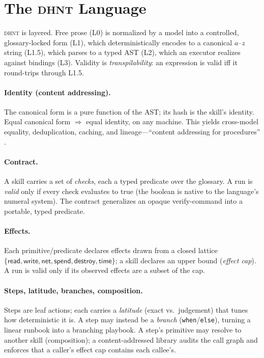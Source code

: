 \documentclass[11pt]{article}
\newcommand{\dhnt}{\textsc{dhnt}}
\begin{document}
\section{The \dhnt{} Language}\label{sec:lang}

\dhnt{} is layered. Free prose (L0) is normalized by a model into a controlled,
glossary-locked form (L1), which deterministically encodes to a canonical
$a$--$z$ string (L1.5), which parses to a typed AST (L2), which an executor
realizes against bindings (L3). Validity is \emph{transpilability}: an expression
is valid iff it round-trips through L1.5.

\paragraph{Identity (content addressing).} The canonical form is a pure function
of the AST; its hash is the skill's identity. Equal canonical form $\Rightarrow$
equal identity, on any machine. This yields cross-model equality, deduplication,
caching, and lineage---``content addressing for procedures'' \cite{merkle}.

\paragraph{Contract.} A skill carries a set of \emph{checks}, each a typed
predicate over the glossary. A run is \emph{valid} only if every check evaluates
to true (the boolean is native to the language's numeral system). The contract
generalizes an opaque verify-command into a portable, typed predicate.

\paragraph{Effects.} Each primitive/predicate declares effects drawn from a
closed lattice $\{\textsf{read}, \textsf{write}, \textsf{net}, \textsf{spend},
\textsf{destroy}, \textsf{time}\}$; a skill declares an upper bound
(\emph{effect cap}). A run is valid only if its observed effects are a subset of
the cap.

\paragraph{Steps, latitude, branches, composition.} Steps are leaf actions; each
carries a \emph{latitude} (exact vs.\ judgement) that tunes how deterministic it
is. A step may instead be a \emph{branch} (\texttt{when}/\texttt{else}),
turning a linear runbook into a branching playbook. A step's primitive may
resolve to another skill (composition); a content-addressed library audits the
call graph and enforces that a caller's effect cap contains each callee's.
\end{document}
